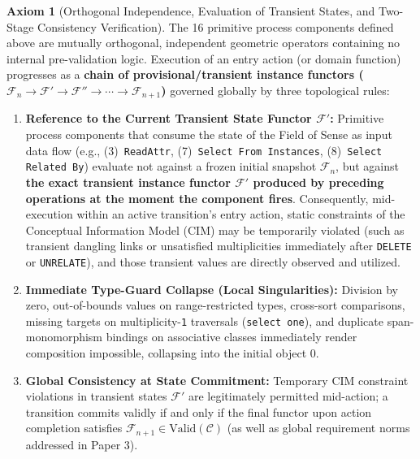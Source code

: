 \documentclass[11pt,a4paper]{article}
\theoremstyle{definition}
\newtheorem{axiom}{Axiom}[section]
\theoremstyle{plain}
\theoremstyle{remark}
\newcommand{\Valid}{\mathrm{Valid}}
\begin{document}
\begin{axiom}[Orthogonal Independence, Evaluation of Transient States, and Two-Stage Consistency Verification]\label{ax:transient}
The 16 primitive process components defined above are mutually orthogonal, independent geometric operators containing no internal pre-validation logic. Execution of an entry action (or domain function) progresses as a \textbf{chain of provisional/transient instance functors ($\mathcal{F}_n \to \mathcal{F}' \to \mathcal{F}'' \to \cdots \to \mathcal{F}_{n+1}$)} governed globally by three topological rules:
\begin{enumerate}
    \item \textbf{Reference to the Current Transient State Functor $\mathcal{F}'$:} Primitive process components that consume the state of the Field of Sense as input data flow (e.g., (3)~\texttt{ReadAttr}, (7)~\texttt{Select From Instances}, (8)~\texttt{Select Related By}) evaluate not against a frozen initial snapshot $\mathcal{F}_n$, but against \textbf{the exact transient instance functor $\mathcal{F}'$ produced by preceding operations at the moment the component fires}. Consequently, mid-execution within an active transition's entry action, static constraints of the Conceptual Information Model (CIM) may be temporarily violated (such as transient dangling links or unsatisfied multiplicities immediately after \texttt{DELETE} or \texttt{UNRELATE}), and those transient values are directly observed and utilized.
    \item \textbf{Immediate Type-Guard Collapse (Local Singularities):} Division by zero, out-of-bounds values on range-restricted types, cross-sort comparisons, missing targets on multiplicity-\texttt{1} traversals (\texttt{select one}), and duplicate span-monomorphism bindings on associative classes immediately render composition impossible, collapsing into the initial object $0$.
    \item \textbf{Global Consistency at State Commitment:} Temporary CIM constraint violations in transient states $\mathcal{F}'$ are legitimately permitted mid-action; a transition commits validly if and only if the final functor upon action completion satisfies $\mathcal{F}_{n+1} \in \Valid(\mathcal{C})$ (as well as global requirement norms addressed in Paper 3).
\end{enumerate}
\end{axiom}
\end{document}
